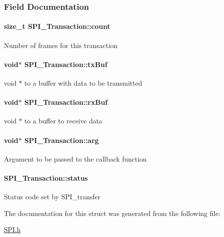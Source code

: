 \subsubsection{Field Documentation}
\paragraph[{count}]{\setlength{\rightskip}{0pt plus 5cm}size\-\_\-t S\-P\-I\-\_\-\-Transaction\-::count}\label{struct_s_p_i___transaction_ad049d6a900c4bdb59a5ee8ce3d5bced2}
Number of frames for this transaction 
\paragraph[{tx\-Buf}]{\setlength{\rightskip}{0pt plus 5cm}void$\ast$ S\-P\-I\-\_\-\-Transaction\-::tx\-Buf}\label{struct_s_p_i___transaction_a9461a248f1cceb4048668d44b323a0b8}
void $\ast$ to a buffer with data to be transmitted 
\paragraph[{rx\-Buf}]{\setlength{\rightskip}{0pt plus 5cm}void$\ast$ S\-P\-I\-\_\-\-Transaction\-::rx\-Buf}\label{struct_s_p_i___transaction_a214f57d7809c875fb9456a62a406e041}
void $\ast$ to a buffer to receive data 
\paragraph[{arg}]{\setlength{\rightskip}{0pt plus 5cm}void$\ast$ S\-P\-I\-\_\-\-Transaction\-::arg}\label{struct_s_p_i___transaction_ac47daaa10705d748ace918a098aa1945}
Argument to be passed to the callback function 
\paragraph[{status}]{ S\-P\-I\-\_\-\-Transaction\-::status}\label{struct_s_p_i___transaction_aa244504b2384411f7de17340be62128a}
Status code set by S\-P\-I\-\_\-transfer 

The documentation for this struct was generated from the following file\-:\begin{DoxyCompactItemize}
\item 
\hyperlink{_s_p_i_8h}{S\-P\-I.\-h}\end{DoxyCompactItemize}
